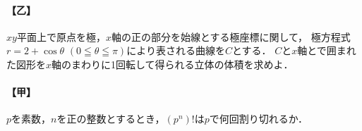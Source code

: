 \documentclass[../../main.tex]{subfiles}
\begin{document}
\paragraph{【乙】}
$xy$平面上で原点を極，$x$軸の正の部分を始線とする極座標に関して，
極方程式$r=2+\cos\theta$ $(0\leqq\theta\leqq\pi)$により表される曲線を$C$とする．
$C$と$x$軸とで囲まれた図形を$x$軸のまわりに1回転して得られる立体の体積を求めよ．

\paragraph{【甲】}
$p$を素数，$n$を正の整数とするとき，$(p^n)!$は$p$で何回割り切れるか．
\end{document}

